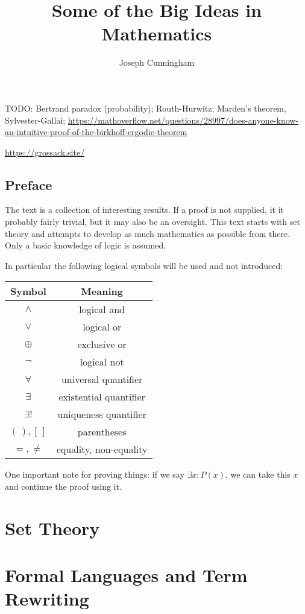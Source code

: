 \documentclass{report}
\title{Some of the Big Ideas in Mathematics}
\author{Joseph Cunningham}
\date{}
\begin{document}
\maketitle
\tableofcontents

TODO: Bertrand paradox (probability); Routh-Hurwitz; Marden's theorem, Sylvester-Gallai; \url{https://mathoverflow.net/questions/28997/does-anyone-know-an-intuitive-proof-of-the-birkhoff-ergodic-theorem}

\url{https://grossack.site/}

\chapter{Preface}
The text is a collection of interesting results. If a proof is not supplied, it it probably fairly trivial, but it may also be an oversight. This text starts with set theory and attempts to develop as much mathematics as possible from there. Only a basic knowledge of logic is assumed.

In particular the following logical symbols will be used and not introduced:
\begin{center}
\begin{tabular}{ c c }
Symbol & Meaning \\
 \hline
$\land$ & logical and \\
$\lor$ & logical or \\
$\oplus$ & exclusive or \\
$\neg$ & logical not \\
$\forall$ & universal quantifier \\
$\exists$ & existential quantifier \\
$\exists!$ & uniqueness quantifier \\
$(\,), [\,]$ & parentheses \\
$=, \neq$ & equality, non-equality
\end{tabular}
\end{center}

One important note for proving things: if we say $\exists x: P(x)$, we can take this $x$ and continue the proof using it.

\part{Set Theory}
\setcounter{chapter}{0} %



\part{Formal Languages and Term Rewriting}
\setcounter{chapter}{0} %

\end{document}
